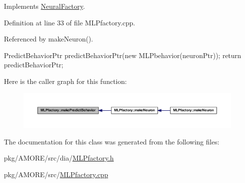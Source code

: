 Implements \hyperlink{class_neural_factory_a3d49ef5f05c82cc2c614e884ed3a27d5}{NeuralFactory}.



Definition at line 33 of file MLPfactory.cpp.



Referenced by makeNeuron().


\begin{DoxyCode}
{
  PredictBehaviorPtr predictBehaviorPtr(new MLPbehavior(neuronPtr));
  return predictBehaviorPtr;
}
\end{DoxyCode}


Here is the caller graph for this function:
\nopagebreak
\begin{figure}[H]
\begin{center}
\leavevmode
\includegraphics[width=400pt]{class_m_l_pfactory_a9e9e9bb4390df09c78a24c4ff79cdab6_icgraph}
\end{center}
\end{figure}




The documentation for this class was generated from the following files:\begin{DoxyCompactItemize}
\item 
pkg/AMORE/src/dia/\hyperlink{_m_l_pfactory_8h}{MLPfactory.h}\item 
pkg/AMORE/src/\hyperlink{_m_l_pfactory_8cpp}{MLPfactory.cpp}\end{DoxyCompactItemize}
